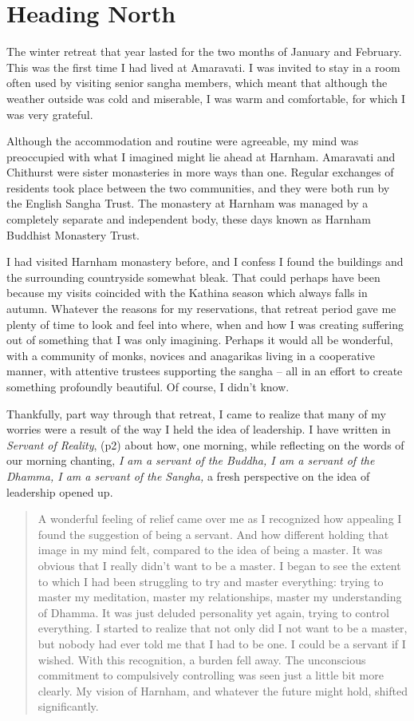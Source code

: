 \chapter{Heading North}

The winter retreat that year lasted for the two months of January and
February. This was the first time I had lived at Amaravati. I was
invited to stay in a room often used by visiting senior sangha members,
which meant that although the weather outside was cold and miserable, I
was warm and comfortable, for which I was very grateful.

Although the accommodation and routine were agreeable, my mind was
preoccupied with what I imagined might lie ahead at Harnham. Amaravati
and Chithurst were sister monasteries in more ways than one. Regular
exchanges of residents took place between the two communities, and they
were both run by the English Sangha Trust. The monastery at Harnham was
managed by a completely separate and independent body, these days known as
Harnham Buddhist Monastery Trust\cite{harnham-trust}.

I had visited Harnham monastery before, and I confess I found the
buildings and the surrounding countryside somewhat bleak. That could perhaps
have been because my \mbox{visits} coincided with the Kathina season which
always falls in autumn. Whatever the reasons for my reservations, that
retreat period gave me plenty of time to look and feel into where, when
and how I was creating suffering out of something that I was only
imagining. Perhaps it would all be wonderful, with a community of monks,
novices and anagarikas living in a cooperative manner, with attentive
trustees supporting the sangha -- all in an effort to create something
profoundly beautiful. Of course, I didn't know.

Thankfully, part way through that retreat, I came to realize that many
of my worries were a result of the way I held the idea of leadership. I
have written in \emph{Servant of Reality}\cite{servant}, (p2) about how, one morning,
while reflecting on the words of our morning chanting, \emph{I am a
servant of the Buddha, I am a servant of the Dhamma, I am a servant of
the Sangha,} a fresh perspective on the idea of leadership opened up.

\begin{quotation}
A wonderful feeling of relief came over me as I recognized how appealing
I found the suggestion of being a servant. And how different holding
that image in my mind felt, compared to the idea of being a master. It
was obvious that I really didn't want to be a master. I began to see the
extent to which I had been struggling to try and master everything:
trying to master my meditation, master my relationships, master my
understanding of Dhamma. It was just deluded personality yet again,
trying to control everything. I started to realize that not only did I
not want to be a master, but nobody had ever told me that I had to be
one. I could be a servant if I wished. With this recognition, a burden
fell away. The unconscious commitment to compulsively controlling was
seen just a little bit more clearly. My vision of Harnham, and whatever
the future might hold, shifted significantly.
\end{quotation}

